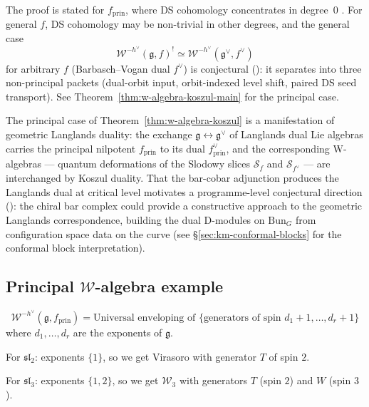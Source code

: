 \begin{remark}
\label{rem:w-koszul-general-nilpotent}
The proof is stated for $f_{\mathrm{prin}}$, where DS cohomology concentrates in degree~$0$ \cite{FF}.  For general $f$, DS cohomology may be non-trivial in other degrees, and the general case
\[
\mathcal{W}^{-h^\vee}(\mathfrak{g}, f)^! \simeq \mathcal{W}^{-h^\vee}(\mathfrak{g}^\vee, f^\vee)
\]
for arbitrary $f$ (Barbasch--Vogan dual $f^\vee$) is conjectural (\ClaimStatusConjectured): it separates into three non-principal packets (dual-orbit input, orbit-indexed level shift, paired DS seed transport).  See Theorem~\ref{thm:w-algebra-koszul-main} for the principal case.
\end{remark}

\begin{remark}
The principal case of Theorem~\ref{thm:w-algebra-koszul} is a manifestation of geometric Langlands duality: the exchange $\mathfrak{g} \leftrightarrow \mathfrak{g}^\vee$ of Langlands dual Lie algebras carries the principal nilpotent $f_{\mathrm{prin}}$ to its dual $f^\vee_{\mathrm{prin}}$, and the corresponding W-algebras --- quantum deformations of the Slodowy slices $\mathcal{S}_f$ and $\mathcal{S}_{f^\vee}$ --- are interchanged by Koszul duality.  That the bar-cobar adjunction produces the Langlands dual at critical level motivates a programme-level conjectural direction (\ClaimStatusConjectured): the chiral bar complex could provide a constructive approach to the geometric Langlands correspondence, building the dual D-modules on $\mathrm{Bun}_G$ from configuration space data on the curve (see \S\ref{sec:km-conformal-blocks} for the conformal block interpretation).
\end{remark}

\subsection{Principal $\mathcal{W}$-algebra example}

\begin{theorem}
\label{thm:principal-w-algebra-structure}
\begin{equation}
\mathcal{W}^{-h^\vee}(\mathfrak{g}, f_{\mathrm{prin}}) = \text{Universal enveloping of } \{\text{generators of spin } d_1+1, \ldots, d_r+1\}
\end{equation}
where $d_1, \ldots, d_r$ are the exponents of $\mathfrak{g}$.

For $\mathfrak{sl}_2$: exponents $\{1\}$, so we get Virasoro with generator $T$ of spin $2$.

For $\mathfrak{sl}_3$: exponents $\{1,2\}$, so we get $\mathcal{W}_3$ with generators $T$ (spin $2$) and $W$ (spin $3$).
\end{theorem}

